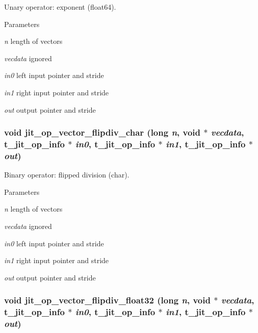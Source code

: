Unary operator: exponent (float64). 
\begin{DoxyParams}{Parameters}
\item[{\em n}]length of vectors \item[{\em vecdata}]ignored \item[{\em in0}]left input pointer and stride \item[{\em in1}]right input pointer and stride \item[{\em out}]output pointer and stride \end{DoxyParams}
\hypertarget{group__opvecmod_ga78061bb22cdd68b8aff44ee2d1a01ce0}{
\subsubsection[{jit\_\-op\_\-vector\_\-flipdiv\_\-char}]{\setlength{\rightskip}{0pt plus 5cm}void jit\_\-op\_\-vector\_\-flipdiv\_\-char (long {\em n}, \/  void $\ast$ {\em vecdata}, \/  {\bf t\_\-jit\_\-op\_\-info} $\ast$ {\em in0}, \/  {\bf t\_\-jit\_\-op\_\-info} $\ast$ {\em in1}, \/  {\bf t\_\-jit\_\-op\_\-info} $\ast$ {\em out})}}
\label{group__opvecmod_ga78061bb22cdd68b8aff44ee2d1a01ce0}


Binary operator: flipped division (char). 
\begin{DoxyParams}{Parameters}
\item[{\em n}]length of vectors \item[{\em vecdata}]ignored \item[{\em in0}]left input pointer and stride \item[{\em in1}]right input pointer and stride \item[{\em out}]output pointer and stride \end{DoxyParams}
\hypertarget{group__opvecmod_ga00e97f99263939c023aaf3e8b661131d}{
\subsubsection[{jit\_\-op\_\-vector\_\-flipdiv\_\-float32}]{\setlength{\rightskip}{0pt plus 5cm}void jit\_\-op\_\-vector\_\-flipdiv\_\-float32 (long {\em n}, \/  void $\ast$ {\em vecdata}, \/  {\bf t\_\-jit\_\-op\_\-info} $\ast$ {\em in0}, \/  {\bf t\_\-jit\_\-op\_\-info} $\ast$ {\em in1}, \/  {\bf t\_\-jit\_\-op\_\-info} $\ast$ {\em out})}}
\label{group__opvecmod_ga00e97f99263939c023aaf3e8b661131d}


